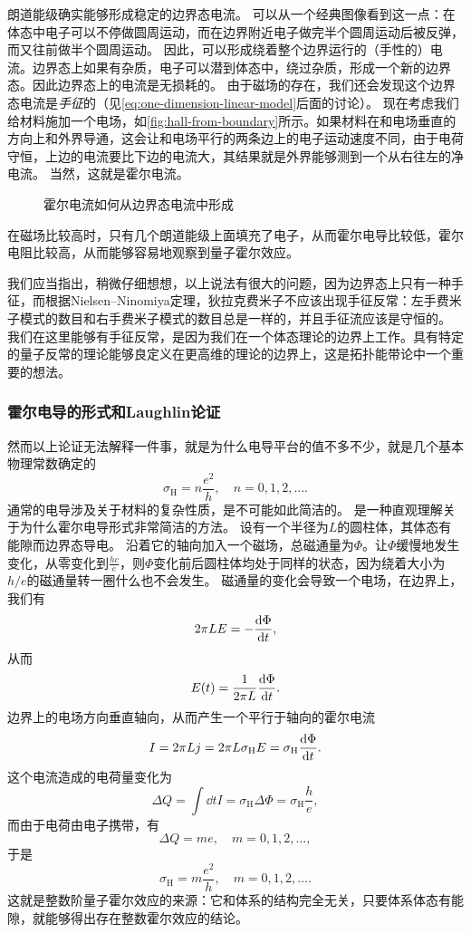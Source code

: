 朗道能级确实能够形成稳定的边界态电流。
可以从一个经典图像看到这一点：在体态中电子可以不停做圆周运动，而在边界附近电子做完半个圆周运动后被反弹，而又往前做半个圆周运动。
因此，可以形成绕着整个边界运行的（手性的）电流。边界态上如果有杂质，电子可以潜到体态中，绕过杂质，形成一个新的边界态。因此边界态上的电流是无损耗的。
由于磁场的存在，我们还会发现这个边界态电流是\emph{手征}的（见\eqref{eq:one-dimension-linear-model}后面的讨论）。
现在考虑我们给材料施加一个电场，如\autoref{fig:hall-from-boundary}所示。如果材料在和电场垂直的方向上和外界导通，这会让和电场平行的两条边上的电子运动速度不同，由于电荷守恒，上边的电流要比下边的电流大，其结果就是外界能够测到一个从右往左的净电流。
当然，这就是霍尔电流。

\begin{figure}
    \centering
    
    \caption{霍尔电流如何从边界态电流中形成}
    \label{fig:hall-from-boundary}
\end{figure}

在磁场比较高时，只有几个朗道能级上面填充了电子，从而霍尔电导比较低，霍尔电阻比较高，从而能够容易地观察到量子霍尔效应。

我们应当指出，稍微仔细想想，以上说法有很大的问题，因为边界态上只有一种手征，而根据Nielsen–Ninomiya定理，狄拉克费米子不应该出现手征反常：左手费米子模式的数目和右手费米子模式的数目总是一样的，并且手征流应该是守恒的。
我们在这里能够有手征反常，是因为我们在一个体态理论的边界上工作。具有特定的量子反常的理论能够良定义在更高维的理论的边界上，这是拓扑能带论中一个重要的想法。

\subsubsection{霍尔电导的形式和Laughlin论证}

然而以上论证无法解释一件事，就是为什么电导平台的值不多不少，就是几个基本物理常数确定的
\[
    \sigma_\text{H} = n \frac{e^2}{h}, \quad n = 0, 1, 2, \ldots.
\]
通常的电导涉及关于材料的复杂性质，是不可能如此简洁的。
是一种直观理解关于为什么霍尔电导形式非常简洁的方法。
设有一个半径为$L$的圆柱体，其体态有能隙而边界态导电。
沿着它的轴向加入一个磁场，总磁通量为$\Phi$。让$\Phi$缓慢地发生变化，从零变化到$\frac{h c}{e}$，则$\Phi$变化前后圆柱体均处于同样的状态，因为绕着大小为$h / e$的磁通量转一圈什么也不会发生。
磁通量的变化会导致一个电场，在边界上，我们有
\[
    2 \pi L E = - \dv{\Phi}{t},
\]
从而
\[
    E(t) = \frac{1}{2\pi L} \dv{\Phi}{t}.
\]
边界上的电场方向垂直轴向，从而产生一个平行于轴向的霍尔电流
\[
    I = 2 \pi L j = 2 \pi L \sigma_\text{H} E = {\sigma_\text{H}} \dv{\Phi}{t}.
\]
这个电流造成的电荷量变化为
\[
    \Delta Q = \int \dd{t} I = {\sigma_\text{H}} \Delta \Phi = \sigma_\text{H} \frac{h}{e},
\]
而由于电荷由电子携带，有
\[
    \Delta Q = me, \quad m = 0, 1, 2, \ldots,
\]
于是
\[
    \sigma_\text{H} = m \frac{e^2}{h}, \quad m = 0, 1, 2, \ldots.
\]
这就是整数阶量子霍尔效应的来源：它和体系的结构完全无关，只要体系体态有能隙，就能够得出存在整数霍尔效应的结论。

